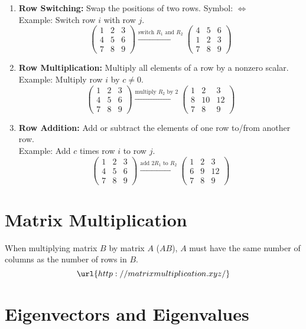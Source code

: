 \documentclass[12pt]{article}
\begin{document}
\begin{enumerate}
    \item \textbf{Row Switching:} Swap the positions of two rows. Symbol: \(\iff\)\\
    Example: Switch row \(i\) with row \(j\).
    \[
    \begin{pmatrix}
    1 & 2 & 3 \\
    4 & 5 & 6 \\
    7 & 8 & 9
    \end{pmatrix}
    \xrightarrow{\text{switch } R_1 \text{ and } R_2}
    \begin{pmatrix}
    4 & 5 & 6 \\
    1 & 2 & 3 \\
    7 & 8 & 9
    \end{pmatrix}
    \]

    \item \textbf{Row Multiplication:} Multiply all elements of a row by a nonzero scalar.\\
    Example: Multiply row \(i\) by \(c \neq 0\).
    \[
    \begin{pmatrix}
    1 & 2 & 3 \\
    4 & 5 & 6 \\
    7 & 8 & 9
    \end{pmatrix}
    \xrightarrow{\text{multiply } R_2 \text{ by } 2}
    \begin{pmatrix}
    1 & 2 & 3 \\
    8 & 10 & 12 \\
    7 & 8 & 9
    \end{pmatrix}
    \]

    \item \textbf{Row Addition:} Add or subtract the elements of one row to/from another row.\\
    Example: Add \(c\) times row \(i\) to row \(j\).
    \[
    \begin{pmatrix}
    1 & 2 & 3 \\
    4 & 5 & 6 \\
    7 & 8 & 9
    \end{pmatrix}
    \xrightarrow{\text{add } 2R_1 \text{ to } R_2}
    \begin{pmatrix}
    1 & 2 & 3 \\
    6 & 9 & 12 \\
    7 & 8 & 9
    \end{pmatrix}
    \]
\end{enumerate}

\section{Matrix Multiplication}

When multiplying matrix \(B\) by matrix \(A\) (\(AB\)), \(A\) must have the same number of columns as the number of rows in \(B\). \\

\[\url{http://matrixmultiplication.xyz/}\]

\section{Eigenvectors and Eigenvalues}
\end{document}
